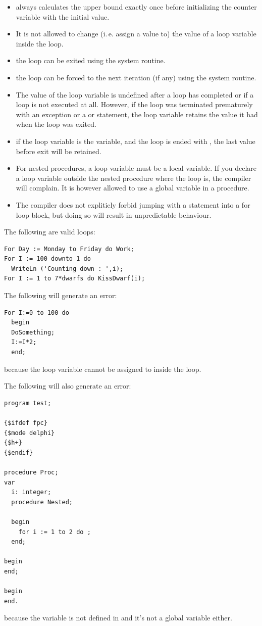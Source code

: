\begin{remark}
\begin{itemize}
\item \fpc always calculates the upper bound exactly once before initializing
the counter variable with the initial value.
\item It is not allowed to change (i.\,e. assign a value to) the value of a
loop variable inside the loop.
\item the loop can be exited using the  system routine.
\item the loop can be forced to the next iteration (if any) using the
 system routine.
\item The value of the loop variable is undefined after a loop has completed or if a loop is not executed at all.
However, if the loop was terminated prematurely with an exception or a  or  statement,
the loop variable retains the value it had when the loop was exited.
\item if the loop variable is the  variable, and the loop is
ended with , the last value before exit will be retained.
\item For nested procedures, a loop variable must be a local variable.
If you declare a loop variable outside the nested procedure where the loop is, the compiler will
complain. It is however allowed to use a global variable in a procedure.
\item The compiler does not expliticly forbid jumping with a  statement into a for loop block,
but doing so will result in unpredictable behaviour.

\end{itemize}
\end{remark}

The following are valid loops:
\begin{verbatim}
For Day := Monday to Friday do Work;
For I := 100 downto 1 do
  WriteLn ('Counting down : ',i);
For I := 1 to 7*dwarfs do KissDwarf(i);
\end{verbatim}
The following will generate an error:
\begin{verbatim}
For I:=0 to 100 do
  begin
  DoSomething;
  I:=I*2;
  end;
\end{verbatim}
because the loop variable  cannot be assigned to inside the loop.

The following will also generate an error:
\begin{verbatim}
program test;

{$ifdef fpc}
{$mode delphi}
{$h+}
{$endif}

procedure Proc;
var
  i: integer;
  procedure Nested;

  begin
    for i := 1 to 2 do ;
  end;

begin
end;

begin
end.
\end{verbatim}
because the variable  is not defined in  and it's not
a global variable either.

